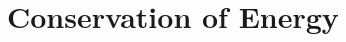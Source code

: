 \documentclass[12pt,compress,aspectratio=169]{beamer}
\begin{document}
\section{Conservation of Energy}

%
%
\end{document}
